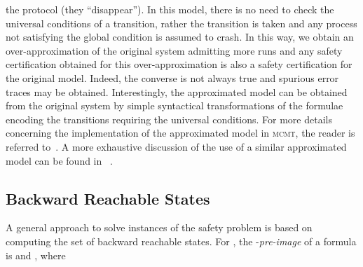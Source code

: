 \documentclass{LMCS}
\theoremstyle{plain}\newtheorem{assumption}[thm]{Assumption}
\theoremstyle{plain}\newtheorem{proposition}[thm]{Proposition}
\theoremstyle{plain}\newtheorem{property}[thm]{Property}
\theoremstyle{plain}\newtheorem{example}[thm]{Example}
\theoremstyle{plain}\newtheorem{claim}[thm]{Claim}
\theoremstyle{plain}\newtheorem{lemma}[thm]{Lemma}
\begin{document}
  the protocol (they ``disappear'').  In this model, there is no need
  to check the universal conditions of a transition, rather the
  transition is taken and any process not satisfying the global
  condition is assumed to crash.  In this way, we obtain an
  over-approximation of the original system admitting more runs and
  any safety certification obtained for this over-approximation is
  also a safety certification for the original model.  Indeed, the
  converse is not always true and spurious error traces may be
  obtained.  Interestingly, the approximated model can be obtained
  from the original system by simple syntactical transformations of
  the formulae encoding the transitions requiring the universal
  conditions. For more details concerning the implementation of the
  approximated model in \textsc{mcmt}, the reader is referred
  to~\cite{stop}.  A more exhaustive discussion of the use of a
  similar approximated model can be found in ~\cite{tacas06,cav06,approx}.



\subsection{Backward Reachable States}
\label{subsec:brs}
A general approach to solve instances of the safety problem is based
on computing the set of backward reachable states.  For , the
-\emph{pre-image} of a formula  is  and
, where
\end{document}
